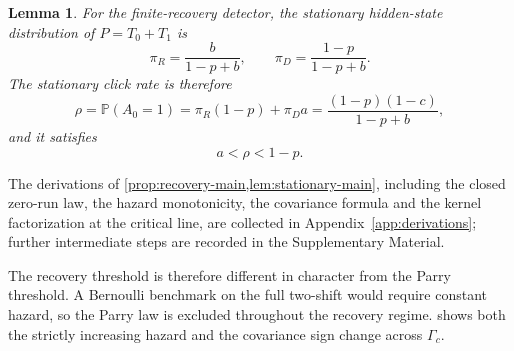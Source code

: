 \documentclass[11pt]{article}
\newtheorem{lemma}[theorem]{Lemma}
\theoremstyle{definition}
\newcommand{\PP}{\mathbb{P}}
\begin{document}
\begin{lemma}\label{lem:stationary-main}
For the finite-recovery detector, the stationary hidden-state distribution of $P=T_0+T_1$ is
\begin{equation}\label{eq:stationary-main}
\pi_R=\frac{b}{1-p+b},
\qquad
\pi_D=\frac{1-p}{1-p+b}.
\end{equation}
The stationary click rate is therefore
\begin{equation}\label{eq:rho-main}
\rho=\PP(A_0=1)=\pi_R(1-p)+\pi_D a=\frac{(1-p)(1-c)}{1-p+b},
\end{equation}
and it satisfies
\begin{equation}\label{eq:rho-bounds-main}
a<\rho<1-p.
\end{equation}
\end{lemma}

The derivations of \cref{prop:recovery-main,lem:stationary-main}, including the closed zero-run law, the hazard monotonicity, the covariance formula and the kernel factorization at the critical line, are collected in Appendix~\ref{app:derivations}; further intermediate steps are recorded in the Supplementary Material.

The recovery threshold is therefore different in character from the Parry threshold. A Bernoulli benchmark on the full two-shift would require constant hazard, so the Parry law is excluded throughout the recovery regime.  shows both the strictly increasing hazard and the covariance sign change across $\Gamma_c$.
\end{document}
